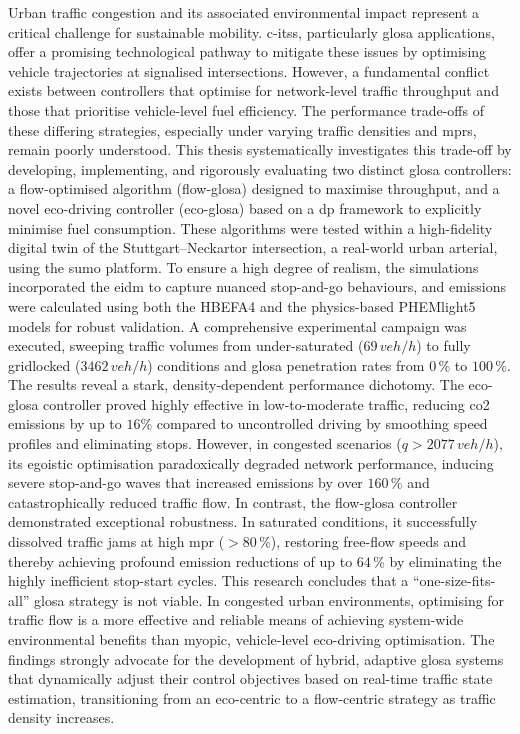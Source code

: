 Urban traffic congestion and its associated environmental impact represent a critical challenge for sustainable mobility. \acp{c-its}, particularly \ac{glosa} applications, offer a promising technological pathway to mitigate these issues by optimising vehicle trajectories at signalised intersections. However, a fundamental conflict exists between controllers that optimise for network-level traffic throughput and those that prioritise vehicle-level fuel efficiency. The performance trade-offs of these differing strategies, especially under varying traffic densities and \acp{mpr}, remain poorly understood.
\mynewline
This thesis systematically investigates this trade-off by developing, implementing, and rigorously evaluating two distinct \ac{glosa} controllers: a flow-optimised algorithm (\ac{flow-glosa}) designed to maximise throughput, and a novel eco-driving controller (\ac{eco-glosa}) based on a \ac{dp} framework to explicitly minimise fuel consumption. These algorithms were tested within a high-fidelity digital twin of the Stuttgart–Neckartor intersection, a real-world urban arterial, using the \ac{sumo} platform. To ensure a high degree of realism, the simulations incorporated the \ac{eidm} to capture nuanced stop-and-go behaviours, and emissions were calculated using both the HBEFA4 and the physics-based PHEMlight5 models for robust validation. A comprehensive experimental campaign was executed, sweeping traffic volumes from under-saturated ($69\,\unit{veh/h}$) to fully gridlocked ($3462\,\unit{veh/h}$) conditions and \ac{glosa} penetration rates from $0\,\%$ to $100\,\%$.
\mynewline
The results reveal a stark, density-dependent performance dichotomy. The \ac{eco-glosa} controller proved highly effective in low-to-moderate traffic, reducing \ac{co2} emissions by up to $16\%$ compared to uncontrolled driving by smoothing speed profiles and eliminating stops. However, in congested scenarios ($q > 2077\,\unit{veh/h}$), its egoistic optimisation paradoxically degraded network performance, inducing severe stop-and-go waves that increased emissions by over $160\,\%$ and catastrophically reduced traffic flow. In contrast, the \ac{flow-glosa} controller demonstrated exceptional robustness. In saturated conditions, it successfully dissolved traffic jams at high \ac{mpr} ($>80\,\%$), restoring free-flow speeds and thereby achieving profound emission reductions of up to $64\,\%$ by eliminating the highly inefficient stop-start cycles.
\mynewline
This research concludes that a \enquote{one-size-fits-all} \ac{glosa} strategy is not viable. In congested urban environments, optimising for traffic flow is a more effective and reliable means of achieving system-wide environmental benefits than myopic, vehicle-level eco-driving optimisation. The findings strongly advocate for the development of hybrid, adaptive \ac{glosa} systems that dynamically adjust their control objectives based on real-time traffic state estimation, transitioning from an eco-centric to a flow-centric strategy as traffic density increases.
